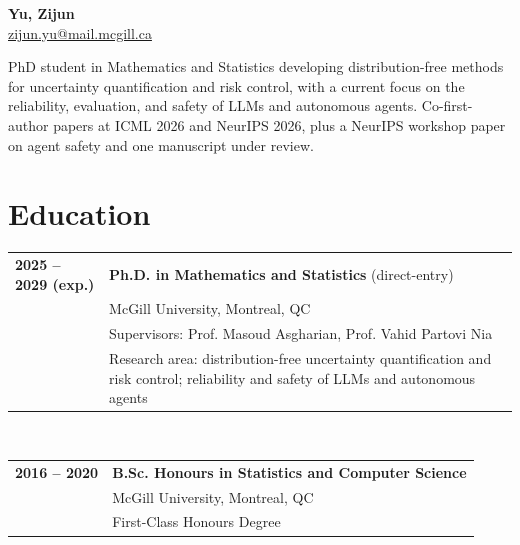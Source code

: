 \documentclass[11pt,letterpaper]{article}
\begin{document}

\begin{center}
	{\LARGE \textbf{Yu, Zijun}}\\[0.15cm]
	\href{mailto:zijun.yu@mail.mcgill.ca}{zijun.yu@mail.mcgill.ca}
\end{center}

\vspace{0.15cm}

\noindent
PhD student in Mathematics and Statistics developing distribution-free methods for uncertainty quantification and risk control, with a current focus on the reliability, evaluation, and safety of LLMs and autonomous agents. Co-first-author papers at ICML 2026 and NeurIPS 2026, plus a NeurIPS workshop paper on agent safety and one manuscript under review.

\vspace{0.2cm}


\section*{Education}

\noindent
\begin{tabular}{p{} p{}}
	\textbf{2025 -- 2029 (exp.)} & \textbf{Ph.D. in Mathematics and Statistics} (direct-entry)  \\
	                             & McGill University, Montreal, QC                             \\
	                             & Supervisors: Prof. Masoud Asgharian, Prof. Vahid Partovi Nia\\
	                             & Research area: distribution-free uncertainty quantification and risk control; reliability and safety of LLMs and autonomous agents
\end{tabular}
\\[0.15cm]
\noindent
\begin{tabular}{p{} p{}}
	\textbf{2016 -- 2020} & \textbf{B.Sc. Honours in Statistics and Computer Science} \\
	                      & McGill University, Montreal, QC                           \\
	                      & First-Class Honours Degree                                \\
\end{tabular}
\end{document}
